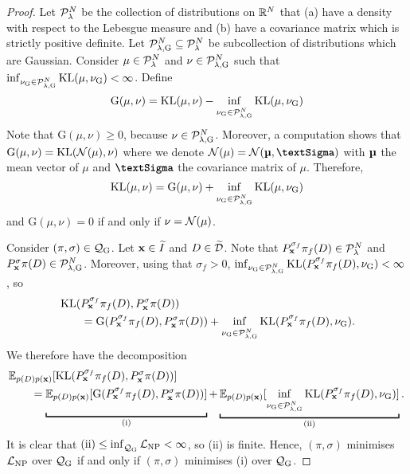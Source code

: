 \documentclass[12pt, twoside]{report}
\begin{document}
\begin{proof}
    Let $\mathcal{P}^N_\lambda$ be the collection of distributions on $\mathbb{R}^N$
    that (a) have a density with respect to the Lebesgue measure and (b) have a covariance matrix which is strictly positive definite.
    Let $\Pc\ss{$\lambda$,G}^N \sub \Pc_\lambda^N$ be subcollection of distributions which are Gaussian.
    Consider $\mu \in \mathcal{P}_\lambda^N$ and $\nu \in \Pc\ss{$\lambda$,G}^N$ such that
    $\inf_{\nu\ss{G} \in \Pc\ss{$\lambda$,G}^N} \KL(\mu, \nu\ss{G}) < \infty$.
    Define
    \begin{equation}
        \text{G}(\mu, \nu) =
            \KL(\mu, \nu) - \inf_{\nu\ss{G} \in \Pc\ss{$\lambda$,G}^N} \KL(\mu, \nu\ss{G})
    \end{equation}
    Note that $\text{G}(\mu, \nu) \ge 0$, because $\nu \in \Pc\ss{$\lambda$,G}^N$.
    Moreover, a computation shows that $\text{G}(\mu, \nu) = \operatorname{KL}(\mathcal{N}(\mu), \nu)$
    where we denote $\Normal(\mu) = \Normal(\vmu, \mSigma)$ with $\vmu$ the mean vector of $\mu$ and $\mSigma$ the covariance matrix of $\mu$.
    Therefore,
    \begin{equation}
        \KL(\mu, \nu)
        =
        \text{G}(\mu, \nu)
        + \inf_{\nu\ss{G} \in \Pc\ss{$\lambda$,G}^N} \KL(\mu, \nu\ss{G})
    \end{equation}
 and $\text{G}(\mu, \nu) = 0$ if and only if $\nu = \mathcal{N}(\mu)$.

    Consider $(\pi, \sigma) \in \Qc\ss{G}$.
    Let $\mathbf{x} \in \widetilde{I}$ and $D \in \widetilde{\mathcal{D}}$.
    Note that $P^{\sigma_f}_{\mathbf{x}} \pi_f(D) \in \mathcal{P}_\lambda^N$ and $P_\vx^\sigma \pi(D) \in \Pc\ss{$\lambda$,G}^N$.
    Moreover, using that $\sigma_f > 0$, $\inf_{\nu\ss{G} \in \Pc\ss{$\lambda$,G}^N} \KL(P_\vx^{\sigma_f} \pi_f(D), \nu\ss{G}) < \infty$, so
    \begin{align}
        &\KL(P^{\sigma_f}_\vx \pi_f(D), P^{\sigma}_\vx \pi(D)) \nonumber \\
        &\qquad= \text{G}(P^{\sigma_f}_\vx \pi_f(D), P^{\sigma}_\vx \pi(D))
        + \inf_{\nu\ss{G} \in \Pc\ss{$\lambda$,G}^N} \KL(P^{\sigma_f}_\vx \pi_f(D), \nu\ss{G}).
    \end{align}
    We therefore have the decomposition
    \begin{align}
        &\E_{p(D)p(\vx)}[\KL(P^{\sigma_f}_\vx \pi_f(D), P^{\sigma}_\vx \pi(D))] \\
        &\qquad=
        \underbracket[1pt]{\E_{p(D)p(\vx)}[
            \vphantom{\inf_{\nu\ss{G} \in \Pc\ss{G}^N}}
            \text{G}(P^{\sigma_f}_\vx \pi_f(D), P^{\sigma}_\vx \pi(D))
        ]}_{\text{(i)}}
        +
        \underbracket[1pt]{\E_{p(D)p(\vx)}[
            \inf_{\nu\ss{G} \in \Pc\ss{$\lambda$,G}^N} \KL(P^{\sigma_f}_\vx \pi_f(D), \nu\ss{G})
        ]}_{\text{(ii)}}.
         \nonumber
    \end{align}
    It is clear that $\text{(ii)} \le \inf_{\Qc\ss{G}} \L\ss{NP} < \infty$, so (ii) is finite.
    Hence, $(\pi, \sigma)$ minimises $\L\ss{NP}$ over $\Qc\ss{G}$ if and only if $(\pi, \sigma)$ minimises (i) over $\Qc\ss{G}$.


\end{proof}
\end{document}
